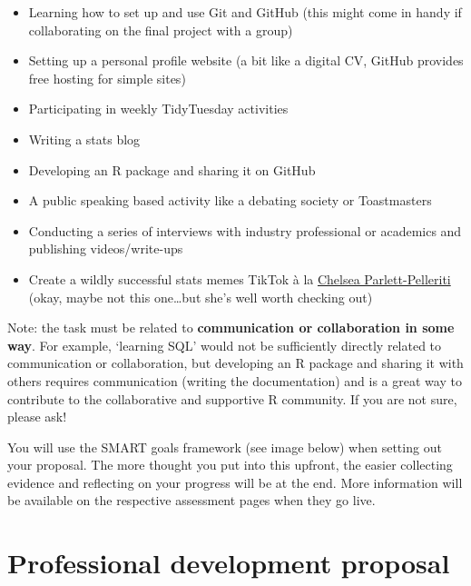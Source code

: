 \documentclass[
  openany]{book}
\begin{document}
\begin{itemize}
\item
  Learning how to set up and use Git and GitHub (this might come in handy if collaborating on the final project with a group)
\item
  Setting up a personal profile website (a bit like a digital CV, GitHub provides free hosting for simple sites)
\item
  Participating in weekly TidyTuesday activities
\item
  Writing a stats blog
\item
  Developing an R package and sharing it on GitHub
\item
  A public speaking based activity like a debating society or Toastmasters
\item
  Conducting a series of interviews with industry professional or academics and publishing videos/write-ups
\item
  Create a wildly successful stats memes TikTok à la \href{https://www.tiktok.com/@chelseaparlettpelleriti/video/6811647290709757189?u_code=d894729j1bcal8\&preview_pb=0\&language=en\&timestamp=1585960235\&user_id=6736543492652696582\&utm_campaign=client_share\&app=musically\&utm_medium=ios\&user_id=6736543492652696582\&tt_from=twitter\&utm_source=twitter\&source=h5_m}{Chelsea Parlett-Pelleriti} (okay, maybe not this one\ldots but she's well worth checking out)
\end{itemize}

Note: the task must be related to \textbf{communication or collaboration in some way}. For example, `learning SQL' would not be sufficiently directly related to communication or collaboration, but developing an R package and sharing it with others requires communication (writing the documentation) and is a great way to contribute to the collaborative and supportive R community. If you are not sure, please ask!

You will use the SMART goals framework (see image below) when setting out your proposal. The more thought you put into this upfront, the easier collecting evidence and reflecting on your progress will be at the end. More information will be available on the respective assessment pages when they go live.

\hypertarget{professional-development-proposal}{%
\section{Professional development proposal}\label{professional-development-proposal}}
\end{document}
